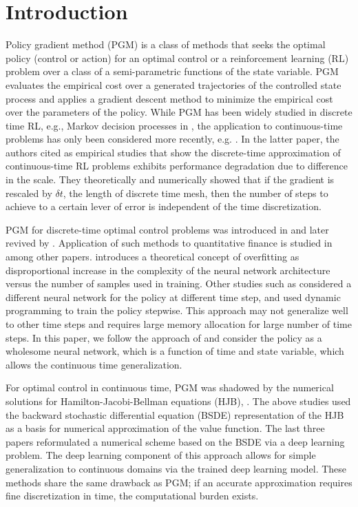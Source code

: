 \documentclass{article}
\numberwithin{equation}{section}
\begin{document}
\section{Introduction}
\label{sec:intro}
Policy gradient method (PGM) is a class of methods that seeks the optimal policy (control or action) for an optimal control or a reinforcement learning (RL) problem over a class of a semi-parametric functions of the state variable. PGM evaluates the empirical cost over a generated trajectories of the controlled state process and applies a gradient descent method to minimize the empirical cost over the parameters of the policy. While PGM has been widely studied in discrete time RL, e.g., Markov decision processes in \citet{K01,SMSM99}, the application to continuous-time problems has only been considered more recently, e.g. \citet{JZ22,JZ23,GRZ24}. In the latter paper, the authors cited \citet{M06, PKK21} as empirical studies that show the discrete-time approximation of continuous-time RL problems exhibits performance degradation due to difference in the scale. They theoretically and numerically showed that if the gradient is rescaled by $\delta t$, the length of discrete time mesh, then the number of steps to achieve to a certain lever of error is independent of the time discretization.

PGM for discrete-time optimal control problems was introduced in \citet{BT96} and later revived by \citet{EH2016}. Application of such methods to  quantitative finance is studied in \citet{FMW20, GPW21, GPW22,RS2023, RST23} among other papers. \citet{RS2023} introduces a theoretical concept of overfitting as disproportional  increase in the complexity of the neural network architecture versus the number of samples used in training. Other studies such as \citet{GPW21, GPW22} considered a different neural network for the policy at different time step, and used dynamic programming to train the policy stepwise. This approach may not generalize well to other time steps and requires large memory allocation for large number of time steps. In this paper, we follow the approach of \citet{RS2023,RST23} and consider the policy as a wholesome neural network, which is a function of time and state variable, which allows the continuous time generalization. 

For optimal control in continuous time, PGM was shadowed by the numerical solutions for Hamilton-Jacobi-Bellman equations (HJB),  \citet{Z01,BT04,FTW11,BF14,ZZ14,JHW17,JHW18,BEJ19}. The above studies used the backward stochastic differential equation (BSDE) representation of the HJB as a basis for numerical approximation of the value function. The last three papers reformulated a numerical scheme based on the BSDE via a deep learning problem. The deep learning component of this approach allows for simple generalization to continuous domains via the trained deep learning model. These methods share the same drawback as PGM; if an accurate approximation requires fine  discretization in time, the computational burden exists.  
\end{document}
